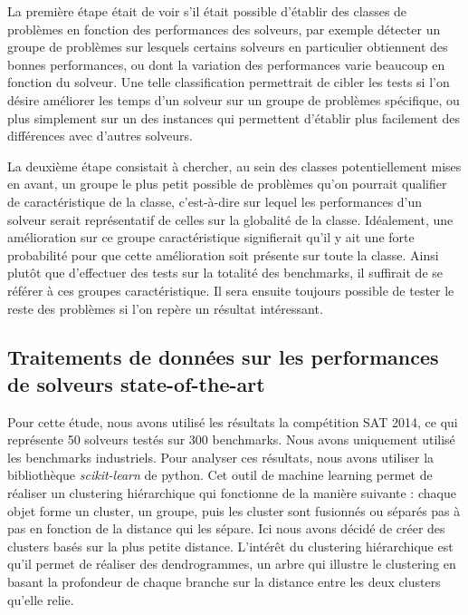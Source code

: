 \documentclass[a4paper,11pt]{article}
\begin{document}
La première étape était de voir s'il était possible d'établir des classes de problèmes en fonction des performances des solveurs, par exemple détecter un groupe de problèmes sur lesquels certains solveurs en 
particulier obtiennent des bonnes performances, ou dont la variation des performances varie beaucoup en fonction du solveur. Une telle classification permettrait de cibler les tests si l'on désire améliorer 
les temps d'un solveur sur un groupe de problèmes spécifique, ou plus simplement sur un des instances qui permettent d'établir plus facilement des différences avec d'autres solveurs.

La deuxième étape consistait à chercher, au sein des classes potentiellement mises en avant, un groupe le plus petit possible de problèmes qu'on pourrait qualifier de caractéristique de la classe, c'est-à-dire 
sur lequel les performances d'un solveur serait représentatif de celles sur la globalité de la classe. Idéalement, une amélioration sur ce groupe caractéristique signifierait qu'il y ait une forte probabilité 
pour que cette amélioration soit présente sur toute la classe. Ainsi plutôt que d'effectuer des tests sur la totalité des benchmarks, il suffirait de se référer à ces groupes caractéristique. Il sera ensuite 
toujours possible de tester le reste des problèmes si l'on repère un résultat intéressant.


\subsection{Traitements de données sur les performances de solveurs state-of-the-art}
Pour cette étude, nous avons utilisé les résultats la compétition SAT 2014, ce qui représente 50 solveurs testés sur 300 benchmarks. Nous avons uniquement utilisé les benchmarks industriels.
Pour analyser ces résultats, nous avons utiliser la bibliothèque \textit{scikit-learn} de python. Cet outil de machine learning permet de réaliser un clustering hiérarchique qui fonctionne de 
la manière suivante : chaque objet forme un cluster, un groupe, puis les cluster sont fusionnés ou séparés pas à pas en fonction de la distance qui les sépare. Ici nous avons décidé de créer des 
clusters basés sur la plus petite distance. L’intérêt du clustering hiérarchique est qu'il permet de réaliser des dendrogrammes, un arbre qui illustre le clustering en basant la profondeur de chaque 
branche sur la distance entre les deux clusters qu'elle relie.
\end{document}
